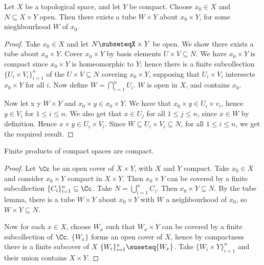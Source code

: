 \begin{lemma}\label{3.4.6}
    Let $X$ be a topological space, and let  $Y$ be compact. Choose  $x_0 \in X$ and $N \subseteq X
    \times Y$ open. Then there exists a tube  $W \times Y$ about  $x_0 \times Y$, for some
    nieghbourhood $W$ of  $x_0$.
\end{lemma}
\begin{proof}
    Take $x_0 \in X$ and let $N \subseteqX \times Y$ be open. We show there
    exists a tube about $x_0 \times Y$. Cover $x_0 \times Y$ by basis elements
    $U \times V \subseteq N$. We have  $x_0 \times Y$ is compact since
    $x_0 \times Y$ is homeomorphic to $Y$; hence there is a finite subcollection
    $\{U_i \times V_i\}_{i=1}^n$ of the $U \times V \subseteq N$ covering  $x_0
    \times Y$, supposing that $U_i \times V_i$ intersects  $x_0 \times Y$ for
    all $i$. Now define $W=\bigcap_{i=1}^n{U_i}$. $W$ is open in  $X$, and
    contains  $x_0$.

    Now let x \times y \in $W \times Y$ and  $x_0 \times y \in x_0 \times Y$.
    We have that $x_0 \times y \in U_i \times v_i$, hence $y \in V_i$ for
    $1 \leq i \leq n$. We also get that  $x \in U_j$ for all  $1 \leq j \leq n$,
    since  $x \in W$ by definition. Hence  $x \times y \in U_i \times V_i$.
    Since  $W \subseteq U_i \times V_i \subseteq N$, for all  $1 \leq i \leq n$,
    we get the required result.
\end{proof}

\begin{theorem}\label{3.4.7}
    Finite products of compact spaces are compact.
\end{theorem}
\begin{proof}
    Let $\Cc$ be an open cover of  $X \times Y$, with  $X$ and  $Y$ compact. Take  $x_0 \in X$ and
    consider $x_0 \times Y$ compact in $X \times Y$. Then  $x_0 \times Y$ can be covered by a finite
    subcollection $\{C_i\}_{i=1}^n \subseteq \Cc$. Take $N=\bigcup_{i=1}^n{C_i}$. Then $x_0 \times Y
    \subseteq N$. By the tube lemma, there is a tube $W \times Y$ about  $x_0 \times Y$ with $W$ a
    neighbourhood of  $x_0$, so $W \times Y \subseteq N$.

    Now for each $x \in X$, choose  $W_x$ such that  $W_x \times Y$ can be covered by a finite
    subcollection of  $\Cc$. $\{W_x\}$ forms an open cover of $X$, hence by compactness there is a
    finite subcover of  $X$  $\{W_i\}_{i=1}^n \suseteq \{W_x\}$. Take $\{W_i \times Y\}_{i=1}^n$ and
    their union contains $X \times Y$.
\end{proof}

